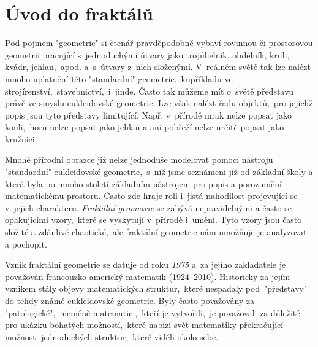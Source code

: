 \chapter{Úvod do fraktálů}\label{chapter:uvod_do_fraktalu}

Pod pojmem "geometrie" si čtenář pravděpodobně vybaví rovinnou či prostorovou geometrii pracující s~jednoduchými útvary jako trojúhelník, obdélník, kruh, kvádr, jehlan,~apod. a~s~útvary z~nich složenými. V~reálném světě tak lze nalézt mnoho uplatnění této "standardní" geometrie,~kupříkladu ve strojírenství,~stavebnictví,~i~jinde. Často tak můžeme mít o~světě představu právě ve smyslu eukleidovské geometrie. Lze však nalézt řadu objektů,~pro jejichž popis jsou tyto představy limitující. Např. v~přírodě mrak nelze popsat jako kouli,~horu nelze popsat jako jehlan a ani pobřeží nelze určitě popsat jako kružnici.\par

Mnohé přírodní obrazce již nelze jednoduše modelovat pomocí nástrojů "standardní" eukleidovské geometrie,~s~níž jsme seznámeni již od základní školy a která byla po mnoho století základním nástrojem pro popis a porozumění matematickému prostoru. Často zde hraje roli i~jistá nahodilost projevující se v~jejich charakteru. \emph{Fraktální geometrie} se zabývá nepravidelnými a často se opakujícími vzory,~které se vyskytují v~přírodě i~umění. Tyto vzory jsou často složité a zdánlivě chaotické,~ale fraktální geometrie nám umožňuje je analyzovat a pochopit.\par

Vznik fraktální geometrie se datuje od roku \emph{1975} a~za jejího zakladatele je považován francouzko-americký matematik  \mbox{(1924--2010)}. Historicky za jejím vznikem stály objevy matematických struktur,~které nespadaly pod~"představy" do tehdy známé eukleidovské geometrie. Byly často považovány za "patologické",~nicméně matematici,~kteří je vytvořili,~je považovali za důležité pro ukázku bohatých možností,~které nabízí svět matematiky překračující možnosti jednoduchých struktur,~které viděli okolo sebe. \citep[str. 33]{Mandelbrot1983}





